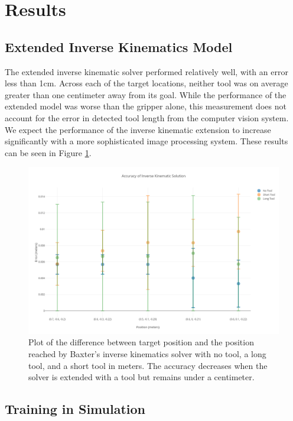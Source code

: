 \documentclass[conference]{IEEEtran}
\begin{document}
\section{Results}

\subsection{Extended Inverse Kinematics Model}
The extended inverse kinematic solver performed relatively well, with an error less than 1cm. Across each of the target locations, neither tool was on average greater than one centimeter away from its goal. While the performance of the extended model was worse than the gripper alone, this measurement does not account for the error in detected tool length from the computer vision system. We expect the performance of the inverse kinematic extension to increase significantly with a more sophisticated image processing system. These results can be seen in Figure \ref{fig:ikextension}. 

\begin{figure}[h!]
\centering
 \includegraphics[scale=0.2]{ikaccurate.png}
 \caption{Plot of the difference between target position and the position reached by Baxter's inverse kinematics solver with no tool, a long tool, and a short tool in meters. The accuracy decreases when the solver is extended with a tool but remains under a centimeter.}
 \label{fig:ikextension}
\end{figure} 

\subsection{Training in Simulation}
\end{document}
